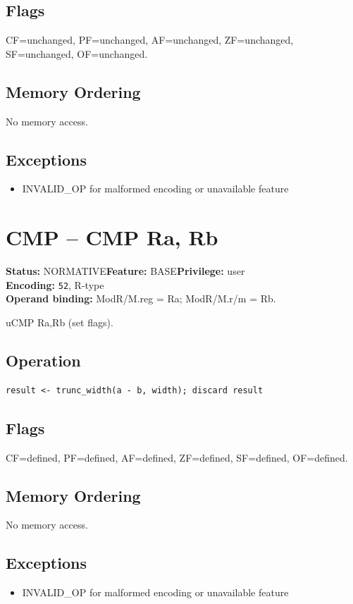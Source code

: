 \documentclass[10pt]{article}
\begin{document}
\subsection*{Flags}
CF=unchanged, PF=unchanged, AF=unchanged, ZF=unchanged, SF=unchanged, OF=unchanged.
\subsection*{Memory Ordering}
No memory access.
\subsection*{Exceptions}
\begin{itemize}
\item INVALID\_OP for malformed encoding or unavailable feature
\end{itemize}
\clearpage

\section{CMP -- CMP Ra, Rb}
\textbf{Status:} NORMATIVE\quad \textbf{Feature:} BASE\quad \textbf{Privilege:} user\\
\textbf{Encoding:} \texttt{52}, R-type\\
\textbf{Operand binding:} ModR/M.reg = Ra; ModR/M.r/m = Rb.

uCMP Ra,Rb (set flags).

\subsection*{Operation}
\begin{lstlisting}
result <- trunc_width(a - b, width); discard result
\end{lstlisting}
\subsection*{Flags}
CF=defined, PF=defined, AF=defined, ZF=defined, SF=defined, OF=defined.
\subsection*{Memory Ordering}
No memory access.
\subsection*{Exceptions}
\begin{itemize}
\item INVALID\_OP for malformed encoding or unavailable feature
\end{itemize}
\clearpage
\end{document}
